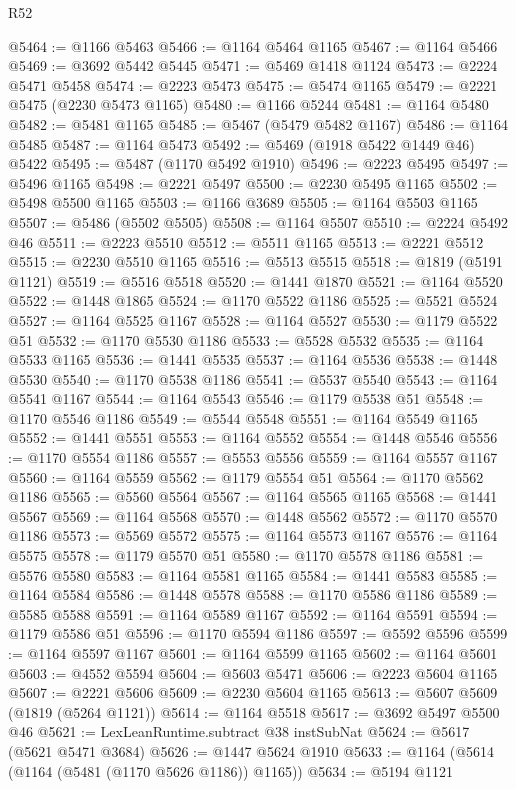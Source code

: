 \begin{lexlean}{R52}
\begin{coremodule}
@5464 := @1166 @5463
@5466 := @1164 @5464 @1165
@5467 := @1164 @5466
@5469 := @3692 @5442 @5445
@5471 := @5469 @1418 @1124
@5473 := @2224 @5471 @5458
@5474 := @2223 @5473
@5475 := @5474 @1165
@5479 := @2221 @5475 (@2230 @5473 @1165)
@5480 := @1166 @5244
@5481 := @1164 @5480
@5482 := @5481 @1165
@5485 := @5467 (@5479 @5482 @1167)
@5486 := @1164 @5485
@5487 := @1164 @5473
@5492 := @5469 (@1918 @5422 @1449 @46) @5422
@5495 := @5487 (@1170 @5492 @1910)
@5496 := @2223 @5495
@5497 := @5496 @1165
@5498 := @2221 @5497
@5500 := @2230 @5495 @1165
@5502 := @5498 @5500 @1165
@5503 := @1166 @3689
@5505 := @1164 @5503 @1165
@5507 := @5486 (@5502 @5505)
@5508 := @1164 @5507
@5510 := @2224 @5492 @46
@5511 := @2223 @5510
@5512 := @5511 @1165
@5513 := @2221 @5512
@5515 := @2230 @5510 @1165
@5516 := @5513 @5515
@5518 := @1819 (@5191 @1121)
@5519 := @5516 @5518
@5520 := @1441 @1870
@5521 := @1164 @5520
@5522 := @1448 @1865
@5524 := @1170 @5522 @1186
@5525 := @5521 @5524
@5527 := @1164 @5525 @1167
@5528 := @1164 @5527
@5530 := @1179 @5522 @51
@5532 := @1170 @5530 @1186
@5533 := @5528 @5532
@5535 := @1164 @5533 @1165
@5536 := @1441 @5535
@5537 := @1164 @5536
@5538 := @1448 @5530
@5540 := @1170 @5538 @1186
@5541 := @5537 @5540
@5543 := @1164 @5541 @1167
@5544 := @1164 @5543
@5546 := @1179 @5538 @51
@5548 := @1170 @5546 @1186
@5549 := @5544 @5548
@5551 := @1164 @5549 @1165
@5552 := @1441 @5551
@5553 := @1164 @5552
@5554 := @1448 @5546
@5556 := @1170 @5554 @1186
@5557 := @5553 @5556
@5559 := @1164 @5557 @1167
@5560 := @1164 @5559
@5562 := @1179 @5554 @51
@5564 := @1170 @5562 @1186
@5565 := @5560 @5564
@5567 := @1164 @5565 @1165
@5568 := @1441 @5567
@5569 := @1164 @5568
@5570 := @1448 @5562
@5572 := @1170 @5570 @1186
@5573 := @5569 @5572
@5575 := @1164 @5573 @1167
@5576 := @1164 @5575
@5578 := @1179 @5570 @51
@5580 := @1170 @5578 @1186
@5581 := @5576 @5580
@5583 := @1164 @5581 @1165
@5584 := @1441 @5583
@5585 := @1164 @5584
@5586 := @1448 @5578
@5588 := @1170 @5586 @1186
@5589 := @5585 @5588
@5591 := @1164 @5589 @1167
@5592 := @1164 @5591
@5594 := @1179 @5586 @51
@5596 := @1170 @5594 @1186
@5597 := @5592 @5596
@5599 := @1164 @5597 @1167
@5601 := @1164 @5599 @1165
@5602 := @1164 @5601
@5603 := @4552 @5594
@5604 := @5603 @5471
@5606 := @2223 @5604 @1165
@5607 := @2221 @5606
@5609 := @2230 @5604 @1165
@5613 := @5607 @5609 (@1819 (@5264 @1121))
@5614 := @1164 @5518
@5617 := @3692 @5497 @5500 @46
@5621 := LexLeanRuntime.subtract @38 instSubNat
@5624 := @5617 (@5621 @5471 @3684)
@5626 := @1447 @5624 @1910
@5633 := @1164 (@5614 (@1164 (@5481 (@1170 @5626 @1186)) @1165))
@5634 := @5194 @1121

\end{coremodule}
\end{lexlean}
